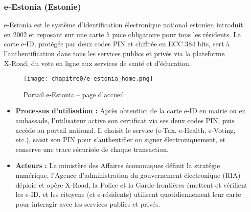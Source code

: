 \subsubsection{e‑Estonia (Estonie)}
e‑Estonia\cite{b2,b25} est le système d’identification électronique national estonien introduit en 2002 et reposant sur une carte à puce obligatoire pour tous les résidents\cite{b26}. La carte e‑ID, protégée par deux codes PIN et chiffrée en ECC 384 bits, sert à l’authentification dans tous les services publics et privés via la plateforme X‑Road\cite{b27}, du vote en ligne aux services de santé et d’éducation\cite{b26}.\\
\begin{figure}[H]
  \centering
  \texttt{[image: chapitre0/e-estonia\_home.png]}
  \caption{Portail e‑Estonia – page d’accueil}
\end{figure}
\begin{itemize}[label=\textbullet]
  \item \textbf{Processus d'utilisation :} Après obtention de la carte e‑ID en mairie ou en ambassade, l’utilisateur active son certificat via ses deux codes PIN\cite{b28}, puis accède au portail national. Il choisit le service (e‑Tax, e‑Health, e‑Voting, etc.), saisit son PIN pour s’authentifier ou signer électroniquement, et conserve une trace sécurisée de chaque transaction\cite{b28}.
  \item \textbf{Acteurs :} Le ministère des Affaires économiques définit la stratégie numérique\cite{b29}, l’Agence d’administration du gouvernement électronique (RIA) déploie et opère X‑Road\cite{b27}, la Police et la Garde‑frontières émettent et vérifient les e‑ID\cite{b27}, et les citoyens (et e‑résidents) utilisent quotidiennement leur carte pour interagir avec les services publics et privés\cite{b26}.
\end{itemize}

